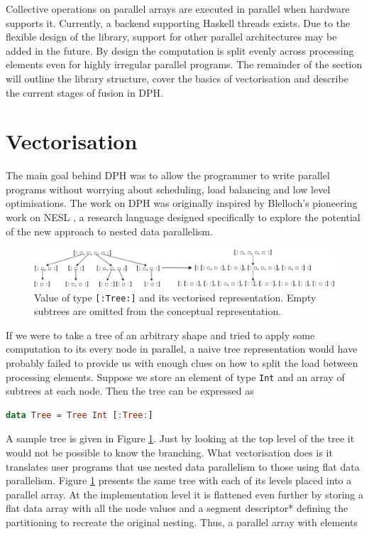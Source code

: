 \documentclass[preamble.tex]{subfiles}
\begin{document}
Collective operations on parallel arrays are executed in parallel when hardware supports it. Currently, a backend supporting Haskell threads \cite{Jones08atutorial} exists. Due to the flexible design of the library, support for other parallel architectures may be added in the future. By design the computation is split evenly across processing elements even for highly irregular parallel programs. The remainder of the section will outline the library structure, cover the basics of vectorisation and describe the current stages of fusion in DPH.


\section{Vectorisation}

The main goal behind DPH was to allow the programmer to write parallel programs without worrying about scheduling, load balancing and low level optimisations. The work on DPH was originally inspired by Blelloch's pioneering work on NESL \cite{BCH+}, a research language designed specifically to explore the potential of the new approach to nested data parallelism.

\begin{figure}
\includegraphics[width=1\textwidth]{img/TreeRepr}

\caption{\label{fig:Lit:Tree}{Value of type \texttt{{[}:Tree:{]}} and its vectorised representation. Empty subtrees are omitted from the conceptual representation.}}
\end{figure}


If we were to take a tree of an arbitrary shape and tried to apply some computation to its every node in parallel, a naive tree representation would have probably failed to provide us with enough clues on how to split the load between processing elements. Suppose we store an element of type \texttt{Int} and an array of subtrees at each node. Then the tree can be expressed as

\begin{lstlisting}[basicstyle={\ttfamily},language=Haskell,tabsize=4]
data Tree = Tree Int [:Tree:]
\end{lstlisting}


A sample tree is given in Figure \ref{fig:Lit:Tree}. Just by looking at the top level of the tree it would not be possible to know the branching. What vectorisation does is it translates user programs that use nested data parallelism to those using flat data parallelism. Figure \ref{fig:Lit:Tree} presents the same tree with each of its levels placed into a parallel array. At the implementation level it is flattened even further by storing a flat data array with all the node values and a \*segment descriptor*\isegd{} defining the partitioning to recreate the original nesting. Thus, a parallel array with elements
\end{document}

